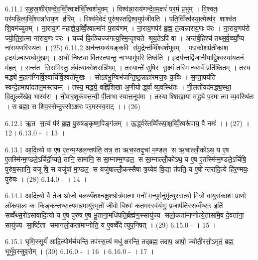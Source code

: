 6.11.1
स॒ह॒स्र॒शीर्॑षन्दे॒व॒व्विँ॒श्वाक्ष॑व्विँ॒श्वशं॑भुवम् । विश्व॑न्ना॒राय॑णन्दे॒व॒म॒क्षरं॑ पर॒मं प्र॒भुम् । वि॒श्वतः॒ पर॑मन्नि॒त्य॒व्विँ॒श्वन्ना॑राय॒ण ह॑रिम् । विश्व॑मे॒वेदं पुरु॑ष॒स्तद्विश्व॒मुप॑जीवति । पति॒व्विँश्व॑स्या॒त्मेश्व॑र॒ शाश्व॑त शि॒वम॑च्युतम् । ना॒राय॒णं म॑हाज्ञे॒य॒व्विँ॒श्वात्मा॑नं प॒राय॑णम् । ना॒राय॒णप॑रं ब्र॒ह्म॒ त॒त्वन्ना॑राय॒णः प॑रः । ना॒राय॒णप॑रो ज्यो॒ति॒रा॒त्मा ना॑राय॒णः प॑रः । यच्च॑ कि॒ञ्चिज्ज॑गत्य॒स्मि॒न्दृ॒श्यते श्रूय॒तेऽपि॑ वा । अन्त॑र्ब॒हिश्च॑ तथ्स॒र्व॒व्व्याँ॒प्य ना॑राय॒णस्स्थि॑तः । (25)
6.11.2
अन॑न्त॒मव्य॑यङ्क॒वि स॑मु॒द्रेन्त॑व्विँ॒श्वशं॑भुवम् । प॒द्म॒को॒शप्र॑तीका॒श॒ हृ॒दय॑ञ्चाप्य॒धोमु॑खम् । अधो॑ नि॒ष्ट्या वि॑तस्त्या॒न्तु॒ ना॒भ्यामु॑परि॒ तिष्ठ॑ति । हृ॒दय॑न्तद्वि॑जानी॒या॒द्वि॒श्वस्या॑यत॒नं म॑हत् । सन्त॑त सि॒राभि॑स्तु॒ लंब॑त्याकोश॒सन्नि॑भम् । तस्यान्ते॑ सुषि॒र सू॒क्ष्मं तस्मिन्थ्स॒र्वं प्रति॑ष्ठितम् । तस्य॒ मद्ध्ये॑ म॒हान॑ग्निर्वि॒श्वार्चि॑र्वि॒श्वतो॑मुखः । सोऽग्र॑भु॒ग्विभ॑जन्ति॒ष्ठ॒न्नाहा॑रमज॒रः क॒विः । स॒न्ता॒पय॑ति स्वन्दे॒हमापा॑दतल॒मस्त॑कम् । तस्य॒ मद्ध्ये॒ वह्नि॑शिखा अ॒णीयोर्द्ध्वा व्य॒वस्थि॑तः । नी॒लतो॑यद॑मद्ध्य॒स्था॒ वि॒द्युल्ले॑खेव॒ भास्व॑रा । नी॒वार॒शूक॑वत्त॒न्वी॒ पी॒ताभास्यात्त॒नूप॑मा । तस्याश्शिखा॒या म॑द्ध्ये प॒रमात्मा व्य॒वस्थि॑तः । स ब्रह्मा॒ स शिव॒स्सेन्द्र॒स्सोऽक्ष॑रः पर॒मस्स्व॒राट् ।। (26)
\anuvakamend

6.12.1
ऋ॒त स॒त्यं प॑रं ब्र॒ह्म॒ पु॒रुष॑ङ्कृष्ण॒पिङ्ग॑लम् । ऊ॒र्द्ध्वरे॑तव्विँ॑रूपा॒क्ष॒व्विँ॒श्वरू॑पाय॒ वै नमः॑ ।। (27) ।12।
6.13.0
- । 13 ।
\anuvakamend

6.13.1
आ॒दि॒त्यो वा ए॒ष ए॒तन्म॒ण्डल॒न्तप॑ति॒ तत्र॒ ता ऋच॒स्तदृ॒चां म॒ण्डल॒ स ऋ॒चाल्लोँ॒कोऽथ॒ य ए॒ष ए॒तस्मि॑न्म॒ण्डले॒ऽर्चिर्दी॒प्यते॒ तानि॒ सामा॑नि॒ स सा॒म्नाम्म॒ण्डल॒ स सा॒म्नाल्लोँ॒कोऽथ॒ य ए॒ष ए॒तस्मि॑न्म॒ण्डले॒ऽर्चिषि॒ पुरु॑ष॒स्तानि॒ यजूषि॒ स यजु॑षां म॒ण्डल॒ स यजु॑षाल्लोँ॒कस्सैषा त्र॒य्येव॑ वि॒द्या त॑पति॒ य ए॒षोन्तरा॑दि॒त्ये हि॑र॒ण्मयः॒ पुरु॑षः । (28)
6.14.0
- । 14 ।
\anuvakamend

6.14.1
आ॒दि॒त्यो वै तेज॒ ओजो॒ बल॒य्यँश॒श्चक्षु॒श्श्रोत्र॑मा॒त्मा मनो॑ म॒न्युर्मनु॑र्मृ॒त्युस्स॒त्यो मि॒त्रो वा॒युरा॑का॒शः प्रा॒णो लो॑कपा॒लः कः किङ्कन्तथ्स॒त्यमन्न॒मायु॑र॒मृतो॑ जी॒वो विश्वः॑ कत॒मस्स्व॑यं॒भुः प्र॒जाप॑तिस्सव्वँथ्स॒र इति॑ सव्वँथ्स॒रो॑ऽसावा॑दि॒त्यो य ए॒ष पुरु॑ष ए॒ष भू॒ताना॒मधि॑पति॒र्ब्रह्म॑ण॒स्सायु॑ज्य सलो॒कता॑माप्नोत्ये॒तासा॑मे॒व दे॒वता॑ना॒ सायु॑ज्य सा॒र्ष्टिता समानलो॒कता॑माप्नोति॒ य ए॒वव्वेँदेत्युप॒निषत् । (29)
6.15.0
- । 15 ।
\anuvakamend

6.15.1
घृणि॒स्सूर्य॑ आदि॒त्योम॑र्चयन्ति॒ तप॑स्स॒त्यं मधु॑ क्षरन्ति॒ तद्ब्रह्म॒ तदाप॒ आपो॒ ज्योती॒रसो॒ऽमृतं॒ ब्रह्म॒ भूर्भु॑व॒स्सुव॒रोम् । (30)
6.16.0
- । 16 ।
6.16.0
- । 17 ।
\anuvakamend

